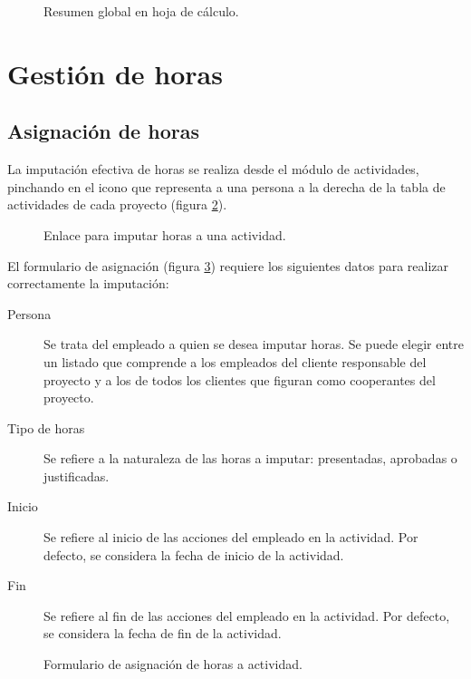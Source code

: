 \begin{figure}
\centering
{}
\caption{Resumen global en hoja de cálculo.}
\label{fig:hoja_calculo_global}
\end{figure}

\section{Gestión de horas}
\label{sec:manual_horas}

\subsection{Asignación de horas}

La imputación efectiva de horas se realiza desde el módulo de actividades,
pinchando en el icono que representa a una persona a la derecha de la tabla de
actividades de cada proyecto (figura \ref{fig:asig_horas}).

\begin{figure}
\centering
{}
\caption{Enlace para imputar horas a una actividad.}
\label{fig:asig_horas}
\end{figure}

El formulario de asignación (figura \ref{fig:form_asig_horas}) requiere los
siguientes datos para realizar correctamente la imputación:

\begin{description}
 \item [Persona] Se trata del empleado a quien se desea imputar horas. Se
puede elegir entre un listado que comprende a los empleados del cliente
responsable del proyecto y a los de todos los clientes que figuran como
cooperantes del proyecto.
 \item [Tipo de horas] Se refiere a la naturaleza de las horas a imputar:
presentadas, aprobadas o justificadas.
 \item [Inicio] Se refiere al inicio de las acciones del empleado en la
actividad. Por defecto, se considera la fecha de inicio de la actividad.
 \item [Fin] Se refiere al fin de las acciones del empleado en la
actividad. Por defecto, se considera la fecha de fin de la actividad.
\end{description}

\begin{figure}
\centering
{}
\caption{Formulario de asignación de horas a actividad.}
\label{fig:form_asig_horas}
\end{figure}


